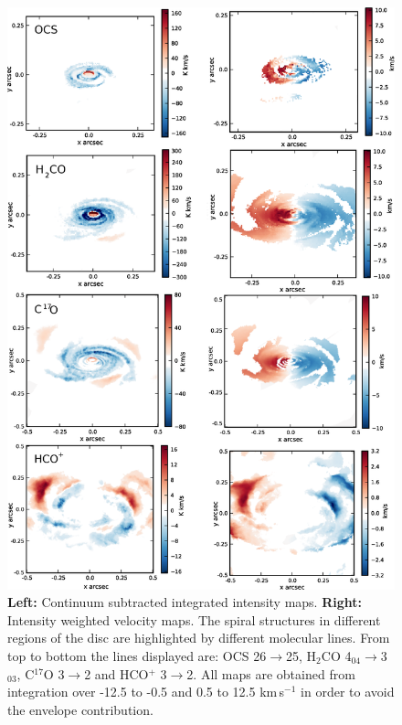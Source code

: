 \documentclass[useAMS,usenatbib]{mn2e}
\begin{document}
\begin{figure}
 \includegraphics[width=150mm]{Figures/sim/imageALL_30deg_all2.eps}
 \caption{{\bf Left:} Continuum subtracted integrated intensity maps. {\bf Right:} Intensity weighted velocity maps. The spiral structures in different regions of the disc are highlighted by different molecular lines. From top to bottom the lines displayed are: OCS 26$\rightarrow$25, H$_2$CO 4$_{04}$$\rightarrow$3$_{03}$, C$^{17}$O 3$\rightarrow$2 and HCO$^+$ 3$\rightarrow$2. All maps are obtained from integration over -12.5 to -0.5 and 0.5 to 12.5 km$\,$s$^{-1}$ in order to avoid the envelope contribution.}
 \label{sim_all}
\end{figure}
\end{document}
